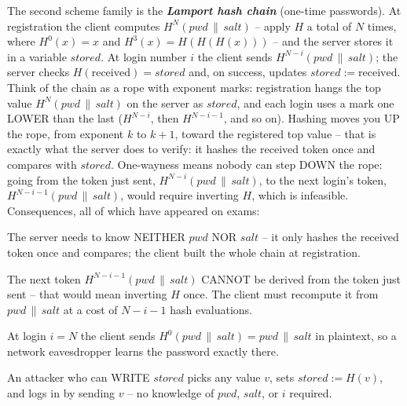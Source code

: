 \documentclass[12pt, a4paper]{article}
\newcommand{\term}[1]{\textbf{\textit{#1}}}        %
\begin{document}
The second scheme family is the \term{Lamport hash chain} (one-time passwords). At registration the client computes $H^{N}(pwd \,\|\, salt)$ -- apply $H$ a total of $N$ times, where $H^{0}(x) = x$ and $H^{3}(x) = H(H(H(x)))$ -- and the server stores it in a variable $stored$.
At login number $i$ the client sends $H^{N-i}(pwd \,\|\, salt)$; the server checks $H(\text{received}) = stored$ and, on success, updates $stored := \text{received}$.
Think of the chain as a rope with exponent marks: registration hangs the top value $H^{N}(pwd \,\|\, salt)$ on the server as $stored$, and each login uses a mark one LOWER than the last ($H^{N-i}$, then $H^{N-i-1}$, and so on).
Hashing moves you UP the rope, from exponent $k$ to $k+1$, toward the registered top value -- that is exactly what the server does to verify: it hashes the received token once and compares with $stored$.
One-wayness means nobody can step DOWN the rope: going from the token just sent, $H^{N-i}(pwd \,\|\, salt)$, to the next login's token, $H^{N-i-1}(pwd \,\|\, salt)$, would require inverting $H$, which is infeasible. Consequences, all of which have appeared on exams:
\begin{tightitem}
    \item The server needs to know NEITHER $pwd$ NOR $salt$ -- it only hashes the received token once and compares; the client built the whole chain at registration.
    \item The next token $H^{N-i-1}(pwd \,\|\, salt)$ CANNOT be derived from the token just sent -- that would mean inverting $H$ once. The client must recompute it from $pwd \,\|\, salt$ at a cost of $N-i-1$ hash evaluations.
    \item At login $i = N$ the client sends $H^{0}(pwd \,\|\, salt) = pwd \,\|\, salt$ in plaintext, so a network eavesdropper learns the password exactly there.
    \item An attacker who can WRITE $stored$ picks any value $v$, sets $stored := H(v)$, and logs in by sending $v$ -- no knowledge of $pwd$, $salt$, or $i$ required.
\end{tightitem}
\end{document}
